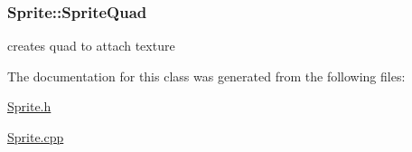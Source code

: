 \subsubsection[{Sprite\+Quad}]{ Sprite\+::\+Sprite\+Quad}\label{class_sprite_a263d37687035ace0db0909f0090dad45}


creates quad to attach texture 



The documentation for this class was generated from the following files\+:\begin{DoxyCompactItemize}
\item 
\hyperlink{_sprite_8h}{Sprite.\+h}\item 
\hyperlink{_sprite_8cpp}{Sprite.\+cpp}\end{DoxyCompactItemize}
